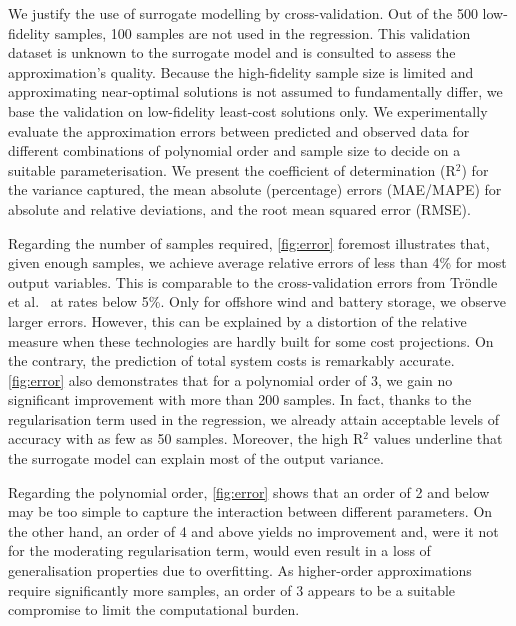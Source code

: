 

We justify the use of surrogate modelling by cross-validation. Out of the 500
low-fidelity samples, 100 samples are not used in the regression. This
validation dataset is unknown to the surrogate model and is consulted to assess
the approximation's quality. Because the high-fidelity sample size is limited
and approximating near-optimal solutions is not assumed to fundamentally differ,
we base the validation on low-fidelity least-cost solutions only. We
experimentally evaluate the approximation errors between predicted and observed
data for different combinations of polynomial order and sample size to decide on
a suitable parameterisation. We present the coefficient of determination (R$^2$)
for the variance captured, the mean absolute (percentage) errors (MAE/MAPE) for
absolute and relative deviations, and the root mean squared error (RMSE).

Regarding the number of samples required, \cref{fig:error} foremost
illustrates that, given enough samples, we achieve average relative errors of
less than 4\% for most output variables. This is comparable to the
cross-validation errors from Tröndle et al.~\cite{trondle_trade-offs_2020} at
rates below 5\%. Only for offshore wind and battery storage, we observe larger
errors. However, this can be explained by a distortion of the relative measure
when these technologies are hardly built for some cost projections. On the
contrary, the prediction of total system costs is remarkably accurate.
\cref{fig:error} also demonstrates that for a polynomial order of 3, we
gain no significant improvement with more than 200 samples. In fact, thanks to
the regularisation term used in the regression, we already attain acceptable
levels of accuracy with as few as 50 samples. Moreover, the high R$^2$ values
underline that the surrogate model can explain most of the output variance.

Regarding the polynomial order, \cref{fig:error} shows that an order of 2
and below may be too simple to capture the interaction between different
parameters. On the other hand, an order of 4 and above yields no improvement
and, were it not for the moderating regularisation term, would even result in a
loss of generalisation properties due to overfitting. As higher-order
approximations require significantly more samples, an order of 3 appears to be a
suitable compromise to limit the computational burden.
